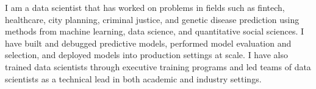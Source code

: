 

\begin{cvparagraph}
I am a data scientist that has worked on problems in fields such as fintech, healthcare, city planning, criminal justice,
and genetic disease prediction using methods from machine learning, data science, and quantitative social sciences.
I have built and debugged predictive models, performed model evaluation and selection, and deployed models into production settings at scale. I have also trained
data scientists through executive training programs and led teams of data scientists as a technical lead in both academic and industry settings.
\end{cvparagraph}
